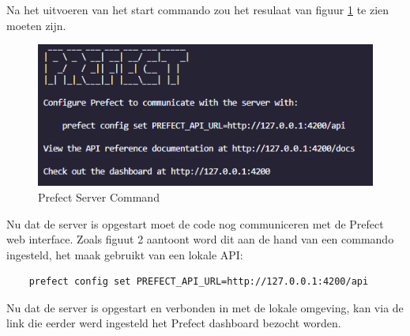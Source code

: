 Na het uitvoeren van het start commando zou het resulaat van figuur \ref{fig:Prefect_server} te zien moeten zijn.
\begin{figure}[]
    \includegraphics[width=\linewidth]{graphics/Prefect_server.PNG}
    \caption{Prefect Server Command}
    \label{fig:Prefect_server}
\end{figure}
Nu dat de server is opgestart moet de code nog communiceren met de Prefect web interface. 
Zoals figuut 2 aantoont word dit aan de hand van een commando ingesteld, het maak gebruikt van een lokale API:
\begin{verbatim}
    prefect config set PREFECT_API_URL=http://127.0.0.1:4200/api
\end{verbatim}
Nu dat de server is opgestart en verbonden in met de lokale omgeving, kan via de link die eerder werd ingesteld het Prefect dashboard bezocht worden.
